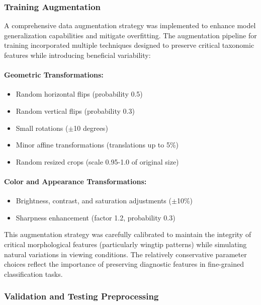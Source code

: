 \subsubsection{Training Augmentation}

A comprehensive data augmentation strategy was implemented to enhance model generalization capabilities and mitigate overfitting. The augmentation pipeline for training incorporated multiple techniques designed to preserve critical taxonomic features while introducing beneficial variability:

\paragraph{Geometric Transformations:}
\begin{itemize}
    \item Random horizontal flips (probability 0.5)
    \item Random vertical flips (probability 0.3)
    \item Small rotations ($\pm$10 degrees)
    \item Minor affine transformations (translations up to 5\%)
    \item Random resized crops (scale 0.95-1.0 of original size)
\end{itemize}

\paragraph{Color and Appearance Transformations:}
\begin{itemize}
    \item Brightness, contrast, and saturation adjustments ($\pm$10\%)
    \item Sharpness enhancement (factor 1.2, probability 0.3)
\end{itemize}

This augmentation strategy was carefully calibrated to maintain the integrity of critical morphological features (particularly wingtip patterns) while simulating natural variations in viewing conditions. The relatively conservative parameter choices reflect the importance of preserving diagnostic features in fine-grained classification tasks.

\subsubsection{Validation and Testing Preprocessing}

